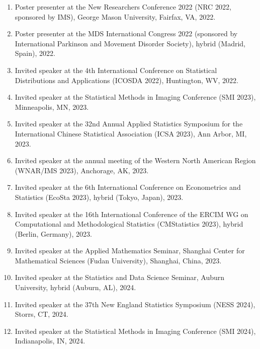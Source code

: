 \documentclass[12pt]{article}
\begin{document}
\begin{enumerate}
		\item Poster presenter at the New Researchers Conference 
		2022 (NRC 2022, sponsored by IMS), George Mason University, 
		Fairfax, VA, 2022.
	
		\item Poster presenter at the MDS International Congress 2022 (sponsored by International Parkinson and Movement Disorder Society), hybrid (Madrid, Spain), 2022.
		
		\item Invited speaker at the 4th International Conference on 
		Statistical Distributions and Applications (ICOSDA 2022), 
		Huntington, WV, 2022. 
		
		\item Invited speaker at the Statistical Methods in Imaging 
		Conference (SMI 2023), Minneapolis, MN, 2023.
		
		\item Invited speaker at the 32nd Annual Applied Statistics 
		Symposium for the International Chinese Statistical 
		Association (ICSA 2023), Ann Arbor, MI, 2023.
		
		\item Invited speaker at the annual meeting of the Western 
		North American Region (WNAR/IMS 2023), Anchorage, AK, 2023.
		
		\item Invited speaker at the 6th International Conference on 
		Econometrics and Statistics (EcoSta 2023), hybrid (Tokyo, 
		Japan), 2023.
		
		\item Invited speaker at the 16th International Conference 
		of the ERCIM WG on Computational and Methodological 
		Statistics (CMStatistics 2023), hybrid (Berlin, Germany), 
		2023.
		
		\item Invited speaker at the Applied Mathematics Seminar, 
		Shanghai Center for Mathematical Sciences (Fudan 
		University), Shanghai, China, 2023.	
		
		\item Invited speaker at the Statistics and Data Science 
		Seminar, Auburn University, hybrid (Auburn, AL), 2024.	
		
		\item Invited speaker at the 37th New England Statistics 
		Symposium (NESS 2024), Storrs, CT, 2024.
		
		\item Invited speaker at the Statistical Methods in Imaging 
		Conference (SMI 2024), Indianapolis, IN, 2024.
		

\end{enumerate}
\end{document}
